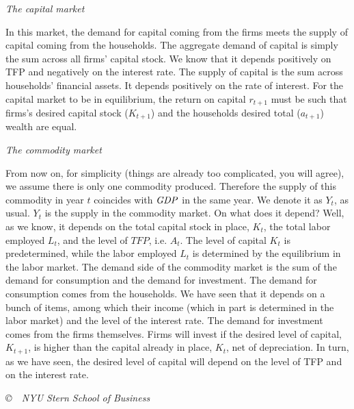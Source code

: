 \documentclass[letterpaper,12pt]{article}
\newcommand{\GDP}{\mbox{\em GDP\/}}
\begin{document}
\textit{The capital market}

In this market, the demand for capital coming from the firms meets
the supply of capital coming from the households. The aggregate
demand of capital is simply the sum across all firms' capital
stock. We know that it depends positively on TFP and negatively on
the interest rate. The supply of capital is the sum across
households' financial assets. It depends positively on the rate of
interest. For the capital market to be in equilibrium, the return
on capital $r_{t+1}$ must be such that firms's desired capital
stock ($K_{t+1}$) and the households desired total ($a_{t+1}$)
wealth are equal.

\textit{The commodity market}

From now on, for simplicity (things are already too complicated,
you will agree), we assume there is only one commodity produced.
Therefore the supply of this commodity in year $t$ coincides with
$\GDP$ in the same year. We denote it as $Y_{t}$, as usual.
$Y_{t}$ is the supply in the commodity market. On what does it
depend? Well, as we know, it depends on the total capital stock in
place, $K_{t}$, the total labor employed $L_{t}$, and the level of
$TFP$, i.e. $A_{t}$. The level of capital $K_{t}$ is
predetermined, while the labor employed $L_{t}$ is determined by
the equilibrium in the labor market. The demand side of the
commodity market is the sum of the demand for consumption and the
demand for investment. The demand for consumption comes from the
households. We have seen that it depends on a bunch of items,
among which their income (which in part is determined in the labor
market) and the level of the interest rate. The demand for
investment comes from the firms themselves. Firms will invest if
the desired level of capital, $K_{t+1}$, is higher than the
capital already in place, $K_{t}$, net of depreciation. In turn,
as we have seen, the desired level of capital will depend on the
level of TFP and on the interest rate.

\vfill \centerline{\it \copyright \ \number\year \ NYU Stern
School of Business}
\end{document}
